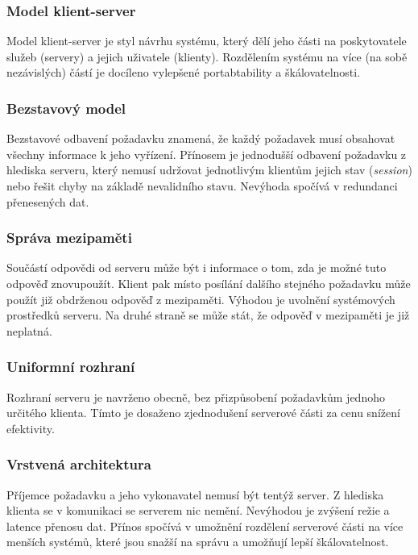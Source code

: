 \subsubsection{Model klient-server}

Model klient-server je styl návrhu systému, který dělí jeho části na poskytovatele služeb (servery) a jejich uživatele (klienty).
Rozdělením systému na více (na sobě nezávislých) částí je docíleno vylepšené portabtability a škálovatelnosti.
\cite{rest_klient_server}

\subsubsection{Bezstavový model}

Bezstavové odbavení požadavku znamená, že každý požadavek musí obsahovat všechny informace k jeho vyřízení.
Přínosem je jednodušší odbavení požadavku z hlediska serveru, který nemusí udržovat jednotlivým klientům jejich stav (\textit{session}) nebo řešit chyby na základě nevalidního stavu.
Nevýhoda spočívá v redundanci přenesených dat.
\cite{rest_bezstavovy}

\subsubsection{Správa mezipaměti}

Součástí odpovědi od serveru může být i informace o tom, zda je možné tuto odpověď znovupoužít.
Klient pak místo posílání dalšího stejného požadavku může použít již obdrženou odpověď z mezipaměti.
Výhodou je uvolnění systémových prostředků serveru.
Na druhé straně se může stát, že odpověď v mezipaměti je již neplatná.
\cite{rest_mezipamet}

\subsubsection{Uniformní rozhraní}

Rozhraní serveru je navrženo obecně, bez přizpůsobení požadavkům jednoho určitého klienta.
Tímto je dosaženo zjednodušení serverové části za cenu snížení efektivity.
\cite{rest_uniformni}

\subsubsection{Vrstvená architektura}

Příjemce požadavku a jeho vykonavatel nemusí být tentýž server.
Z hlediska klienta se v komunikaci se serverem nic nemění.
Nevýhodou je zvýšení režie a latence přenosu dat.
Přínos spočívá v umožnění rozdělení serverové části na více menších systémů, které jsou snažší na správu a umožňují lepší škálovatelnost.
\cite{rest_architektura}

